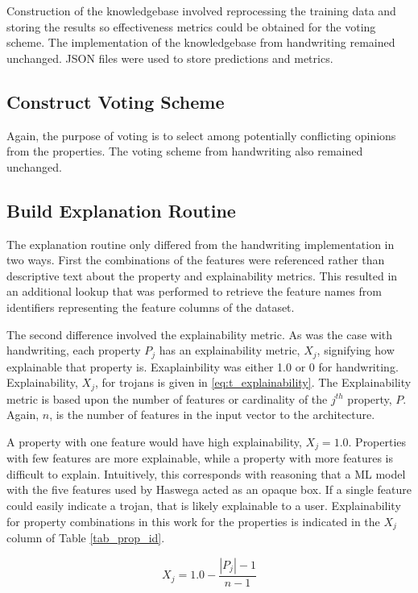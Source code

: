 Construction of the knowledgebase involved reprocessing the training data and
storing the results so effectiveness metrics could be obtained for the voting
scheme.  The implementation of the knowledgebase from handwriting remained
unchanged.  JSON files were used to store predictions and metrics. 

\subsection{Construct Voting Scheme}

Again, the purpose of voting is to select among potentially conflicting opinions
from the properties. The voting scheme from handwriting also remained unchanged.

\subsection{Build Explanation Routine}

The explanation routine only differed from the handwriting implementation in two
ways. First the combinations of the features were referenced rather than
descriptive text about the property and explainability metrics.  This resulted
in an additional lookup that was performed to retrieve the feature names from
identifiers representing the feature columns of the dataset.

The second difference involved the explainability metric.  As was the case with
handwriting, each property $P_j$ has an explainability metric, $X_j$, signifying
how explainable that property is.  Exaplainbility was either 1.0 or 0 for
handwriting. Explainability, $X_j$, for trojans is given in \eqref{eq:t_explainability}. The
Explainability metric is based upon the number of features or cardinality of the
$j^{th}$ property, $P$.  Again, $n$, is the number of features in the input
vector to the architecture.

A property with one feature would have high explainability, $X_j=1.0$.
Properties with few features are more explainable, while a property with more
features is difficult to explain.  Intuitively, this corresponds with reasoning
that a ML model with the five features used by Haswega acted as an opaque box.
If a single feature could easily indicate a trojan, that is likely explainable
to a user.  Explainability for property combinations in this work for the
properties is indicated in the $X_j$ column of Table \ref{tab_prop_id}.

\begin{equation}\label{eq:t_explainability}
    X_j = 1.0 - \frac{|P_j| - 1}{n - 1}
\end{equation}

